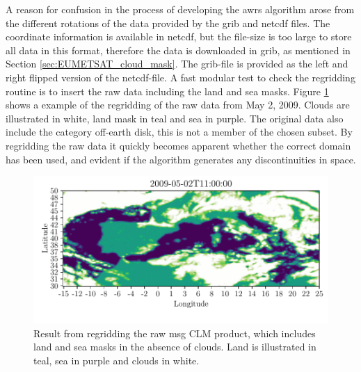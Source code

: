 A reason for confusion in the process of developing the \acrshort{awrs} algorithm arose from the different rotations of the data provided by the \acrshort{grib} and \acrshort{netcdf} files. The coordinate information is available in \acrshort{netcdf}, but the file-size is too large to store all data in this format, therefore the data is downloaded in \acrshort{grib}, as mentioned in Section \ref{sec:EUMETSAT_cloud_mask}. The \acrshort{grib}-file is provided as the left and right flipped version of the  \acrshort{netcdf}-file. A fast modular test to check the regridding routine is to insert the raw data including the land and sea masks. Figure \ref{fig:visual_inspection_regridding} shows a example of the regridding of the raw data from May 2, 2009. Clouds are illustrated in white, land mask in teal and sea in purple. The original data also include the category off-earth disk, this is not a member of the chosen subset. By regridding the raw data it quickly becomes apparent whether the correct domain has been used, and evident if the algorithm generates any discontinuities in space. 
\begin{figure}
    \centering
    \includegraphics{python_figs/visual_regridding.pdf}
    \caption{Result from regridding the raw \acrshort{msg} CLM product, which includes land and sea masks in the absence of clouds. Land is illustrated in teal, sea in purple and clouds in white.}
    \label{fig:visual_inspection_regridding}
\end{figure}

